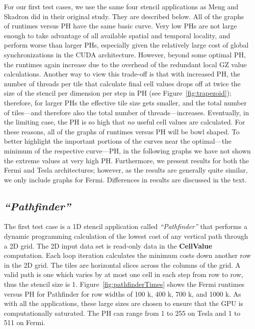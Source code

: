 \documentclass{sig-alternate}
\begin{document}
For our first test cases, we use the same four stencil applications as Meng
and Skadron did in their original study.  They are described below.  All of
the graphs of runtimes versus PH have the same basic curve.  Very low PHs are
not large enough to take advantage of all available spatial and temporal
locality, and perform worse than larger PHs, especially given the relatively
large cost of global synchronizations in the CUDA architecture.  However,
beyond some optimal PH, the runtimes again increase due to the overhead of
the redundant local GZ value calculations.  Another way to view this
trade-off is that with increased PH, the number of threads per tile that
calculate final cell values drops off at twice the size of the stencil per
dimension per step in PH (see Figure~\ref{fig:trapezoid}); therefore, for
larger PHs the effective tile size gets smaller, and the total number of
tiles---and therefore also the total number of threads---increases.
Eventually, in the limiting case, the PH is so high that {\em no} useful cell
values are calculated.  For these reasons, all of the graphs of runtimes
versus PH will be bowl shaped.  To better highlight the important portions of
the curves near the optimal---the minimum of the respective curve---PH, in
the following graphs we have not shown the extreme values at very high PH.
Furthermore, we present results for both the Fermi and Tesla architectures;
however, as the results are generally quite similar, we only include graphs
for Fermi.  Differences in results are discussed in the text.

\subsection{\em ``Pathfinder''}

The first test case is a 1D stencil application called {\em ``Pathfinder''}
that performs a dynamic programming calculation of the lowest cost of any
vertical path through a 2D grid.  The 2D input data set is read-only data in
the {\bf CellValue} computation.  Each loop iteration calculates the minimum
costs down another row in the 2D grid.  The tiles are horizontal slices
across the columns of the grid.  A valid path is one which varies by at most
one cell in each step from row to row, thus the stencil size is 1.
Figure~\ref{fig:pathfinderTimes} shows the Fermi runtimes versus PH for
Pathfinder for row widths of 100 k, 400 k, 700 k, and 1000 k.  As with all
the applications, these large sizes are chosen to ensure that the GPU is
computationally saturated.  The PH can range from 1 to 255 on Tesla and 1 to
511 on Fermi.
\end{document}

